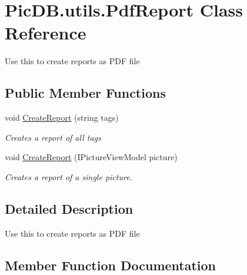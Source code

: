 \hypertarget{class_pic_d_b_1_1utils_1_1_pdf_report}{}\section{Pic\+D\+B.\+utils.\+Pdf\+Report Class Reference}
\label{class_pic_d_b_1_1utils_1_1_pdf_report}


Use this to create reports as P\+DF file  


\subsection*{Public Member Functions}
\begin{DoxyCompactItemize}
\item 
void \mbox{\hyperlink{class_pic_d_b_1_1utils_1_1_pdf_report_aa7e712385da33614ab9fd81f841d9964}{Create\+Report}} (string tags)
\begin{DoxyCompactList}\small\item\em Creates a report of all tags \end{DoxyCompactList}\item 
void \mbox{\hyperlink{class_pic_d_b_1_1utils_1_1_pdf_report_aa4a4b1df10c17c5ad56028419f37d389}{Create\+Report}} (I\+Picture\+View\+Model picture)
\begin{DoxyCompactList}\small\item\em Creates a report of a single picture. \end{DoxyCompactList}\end{DoxyCompactItemize}


\subsection{Detailed Description}
Use this to create reports as P\+DF file 



\subsection{Member Function Documentation}
\mbox{\label{class_pic_d_b_1_1utils_1_1_pdf_report_aa7e712385da33614ab9fd81f841d9964}} 
